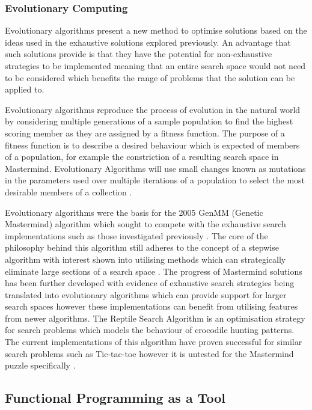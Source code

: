 \documentclass[11pt]{article}  %
\theoremstyle{definition}
\theoremstyle{remark}
\begin{document}
\subsubsection {Evolutionary Computing}

Evolutionary algorithms present a new method to optimise solutions based on the ideas used in the exhaustive solutions explored previously. An advantage that such solutions provide is that they have the potential for non-exhaustive strategies to be implemented meaning that an entire search space would not need to be considered which benefits the range of problems that the solution can be applied to.

Evolutionary algorithms reproduce the process of evolution in the natural world by considering multiple generations of a sample population to find the highest scoring member as they are assigned by a fitness function. The purpose of a fitness function is to describe a desired behaviour which is expected of members of a population, for example the constriction of a resulting search space in Mastermind. Evolutionary Algorithms will use small changes known as mutations in the parameters used over multiple iterations of a population to select the most desirable members of a collection \cite{Evo}.

Evolutionary algorithms were the basis for the 2005 GenMM (Genetic Mastermind) algorithm which sought to compete with the exhaustive search implementations such as those investigated previously \cite{Haystack}. The core of the philosophy behind this algorithm still adheres to the concept of a stepwise algorithm with interest shown into utilising methods which can strategically eliminate large sections of a search space \cite {Haystack}. The progress of Mastermind solutions has been further developed with evidence of exhaustive search strategies being translated into evolutionary algorithms which can provide support for larger search spaces however these implementations can benefit from utilising features from newer algorithms.
The Reptile Search Algorithm is an optimisation strategy for search problems which models the behaviour of crocodile hunting patterns. The current implementations of this algorithm have proven successful for similar search problems such as Tic-tac-toe however it is untested for the Mastermind puzzle specifically \cite{RSA}.


\subsection {Functional Programming as a Tool}
\end{document}
